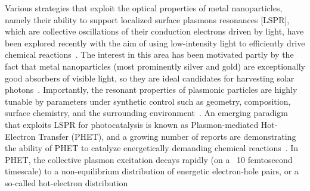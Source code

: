 \documentclass[journal=jpclcd,manuscript=letter]{achemso}
\begin{document}
Various strategies that exploit the optical properties of metal nanoparticles, namely their ability to support localized surface plasmons resonances [LSPR], 
which are collective oscillations of their 
conduction electrons driven by light, have been explored recently with the aim of using low-intensity light to efficiently drive chemical 
reactions~\cite{LCI_NatureMater_2011,KAC_ACSCatalysis_2013,ZLQ_RSCAdvances_2015,PKL_AccChemRes_2015}.  The interest in this area has 
been motivated partly by the fact that metal nanoparticles (most prominently silver and gold) are exceptionally good absorbers of visible light, 
so they are ideal candidates for harvesting solar photons~\cite{AP_NatMat_2010}.  
Importantly, the resonant properties of plasmonic particles are highly tunable by parameters under synthetic control such as geometry, composition, surface chemistry, and the surrounding 
environment~\cite{SX_Science_2002,BCN_ChemRev_2005,GB_NatPhoton_2010}.  An emerging paradigm that exploits LSPR for photocatalysis is known as Plasmon-mediated Hot-Electron Transfer (PHET),
and a growing number of reports are demonstrating the ability of PHET to catalyze energetically demanding chemical 
reactions~\cite{CXL_NatureChem_2011,MZL_Science_2013,MLL_NanoLett_2013,LFP_AC_2015,ZHX_NatPhoton_2016,ZJM_ACSNano_2016,SZZ_PNAS_2016,SCR_JPCC_2016}.
In PHET, the collective plasmon excitation decays rapidly (on a ~10 femtosecond timescale) to a non-equilibrium distribution of energetic electron-hole pairs, or a so-called hot-electron 
distribution~\cite{KAC_ACSCatalysis_2013,GZG_JPCC_2013,SNJ_NatComm_2014,WCM_Science_2015,MWW_NatComm_2015, BSN_ACSNano_2016}  
\end{document}
